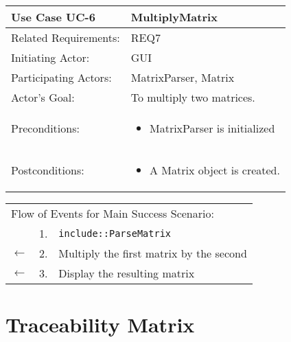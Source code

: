 \documentclass[11pt]{article}
\newcommand{\code}[1]{\texttt{#1}}
\begin{document}
\newpage
\begin{center}
\begin{tabular}{p{1.5in}p{5in}}
\hline
\textbf{Use Case UC-6}     & \textbf{MultiplyMatrix} \\ \hline
Related Requirements: & REQ7 \\
Initiating Actor:     & GUI \\
Participating Actors: &MatrixParser, Matrix \\
Actor's Goal:          & To multiply two matrices. \\
Preconditions:         & \begin{itemize}[nosep]
		      \item  MatrixParser is initialized
                         \end{itemize} \\
Postconditions:        & \begin{itemize}[nosep]
                         \item A Matrix object is created.
                         \end{itemize} \\ \hline
\end{tabular}

\begin{tabular}{p{.25in}p{.25in}p{5.8in}}
\multicolumn{3}{l}{Flow of Events for Main Success Scenario:} \\
              & 1. & \code{include::ParseMatrix}\\
$\leftarrow$  & 2. & Multiply the first matrix by the second\\
$\leftarrow$ & 3. & Display the resulting matrix\\
\end{tabular}
\end{center}



\newpage



\section{Traceability Matrix}
\end{document}
